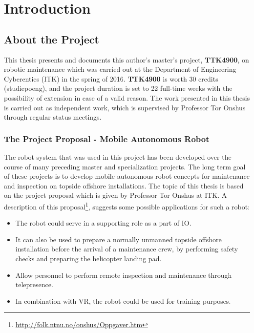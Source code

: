 \chapter{Introduction}
\label{chp:introduction} 

\section{About the Project}

This thesis presents and documents this author's master's project, \textbf{TTK4900}, on robotic maintenance which was carried out at the Department of Engineering Cyberentics (ITK) in the spring of 2016. \textbf{TTK4900} is worth 30 credits (studiepoeng), and the project duration is set to 22 full-time weeks with the possibility of extension in case of a valid reason. The work presented in this thesis is carried out as independent work, which is supervised by Professor Tor Onshus through regular status meetings.


\subsection{The Project Proposal - Mobile Autonomous Robot}

The robot system that was used in this project has been developed over the course of many preceding master and specialization projects. The long term goal of these projects is to develop mobile autonomous robot concepts for maintenance and inspection on topside offshore installations. The topic of this thesis is based on the project proposal which is given by Professor Tor Onshus at \ac{ITK}. A description of this proposal\footnote{\url{http://folk.ntnu.no/onshus/Oppgaver.htm}}, suggests some possible applications for such a robot: 

\begin{itemize}
	\item The robot could serve in a supporting role as a part of \ac{IO}.
	\item It can also be used to prepare a normally unmanned topside offshore installation before the arrival of a maintenance crew, by performing safety checks and preparing the helicopter landing pad.  
	\item Allow personnel to perform remote inspection and maintenance through telepresence.
	\item  In combination with \ac{VR}, the robot could be used for training purposes. 
\end{itemize}

